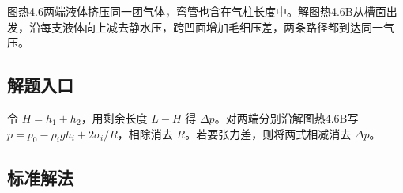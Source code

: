 \documentclass[UTF8,fontset=fandol,a4paper,11pt]{ctexart}
\begin{document}
图热4.6两端液体挤压同一团气体，弯管也含在气柱长度中。解图热4.6B从槽面出发，沿每支液体向上减去静水压，跨凹面增加毛细压差，两条路径都到达同一气压。



\subsection*{解题入口}

令 $H=h_1+h_2$，用剩余长度 $L-H$ 得 $\Delta p$。对两端分别沿解图热4.6B写 $p=p_0-\rho_i gh_i+2\sigma_i/R$，相除消去 $R$。若要张力差，则将两式相减消去 $\Delta p$。




\subsection*{标准解法}
\end{document}
